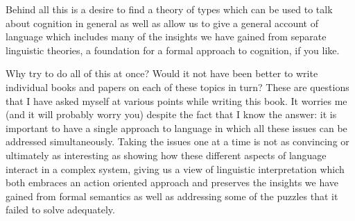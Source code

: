 Behind all this is a desire to find a theory of types which can be
used to talk about cognition in general as well as allow us to give a
general account of language which includes many of the insights we
have gained from separate linguistic theories, a foundation for a
formal approach to cognition, if you like.

Why try to do all of this at once?  Would it not have been better to
write individual books and papers on each of these topics in turn?
These are questions that I have asked myself at various points while
writing this book.  It worries me (and it will probably worry you)
despite the fact that I know the answer:  it is important to have a
single approach to language in which all these issues can be addressed
simultaneously.  Taking the issues one at a time is not as
convincing or ultimately as interesting as showing how these different
aspects of language interact in a complex system, giving us a view
of linguistic interpretation which both embraces an action oriented
approach and preserves the insights we have gained from formal
semantics as well as addressing some of the puzzles that it failed to
solve adequately.  


